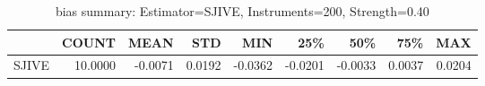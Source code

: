 \begin{table}[ht]
\centering
\caption{bias summary: Estimator=SJIVE, Instruments=200, Strength=0.40}
\begin{tabular}{lrrrrrrrr}
\toprule
 & COUNT & MEAN & STD & MIN & 25\% & 50\% & 75\% & MAX \\
\midrule
SJIVE & 10.0000 & -0.0071 & 0.0192 & -0.0362 & -0.0201 & -0.0033 & 0.0037 & 0.0204 \\
\bottomrule
\end{tabular}
\end{table}
